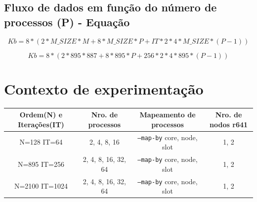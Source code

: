 \documentclass{article}
\begin{document}
\begin{appendices}
\subsection{Fluxo de dados em função do número de processos (P) - Equação}
$$Kb=8*(2*M\_SIZE*M + 8*M\_SIZE*P + IT*2*4*M\_SIZE*(P-1)) $$

$$Kb=8*(2*895*887 + 8*895*P + 256*2*4*895*(P-1)) $$

\section{Contexto de experimentação}

\label{lab_config}
\begin{tabular}{|c|c|c|c|}
\hline
\textbf{Ordem(N) e Iterações(IT)} & \textbf{Nro. de processos} & \textbf{Mapeamento de processos} & \textbf{Nro. de nodos} r641 \\
\hline
N=128 IT=64              & 2, 4, 8, 16          & \texttt{--map-by} core, node, slot & 1, 2               \\
\hline
N=895 IT=256             & 2, 4, 8, 16, 32, 64  & \texttt{--map-by} core, node, slot & 1, 2               \\
\hline
N=2100 IT=1024           & 2, 4, 8, 16, 32, 64  & \texttt{--map-by} core, node, slot & 1, 2               \\
\hline
\end{tabular}

\end{appendices}
\end{document}
